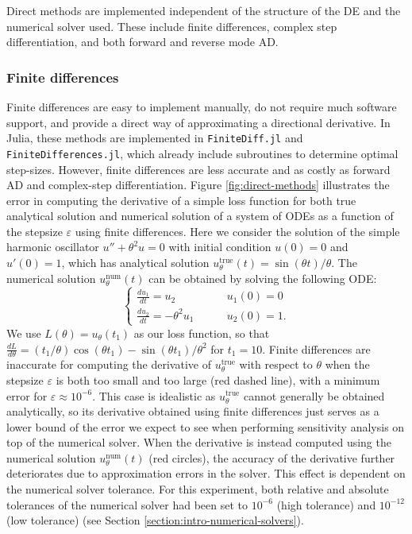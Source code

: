 Direct methods are implemented independent of the structure of the DE and the numerical solver used. 
These include finite differences, complex step differentiation, and both forward and reverse mode AD. 

\subsubsection{Finite differences}
\label{section:software-finite-differences}

Finite differences are easy to implement manually, do not require much software support, and provide a direct way of approximating a directional derivative. 
In Julia, these methods are implemented in \texttt{FiniteDiff.jl} and \texttt{FiniteDifferences.jl}, which already include subroutines to determine optimal step-sizes.
However, finite differences are less accurate and as costly as forward AD \cite{Griewank_1989} and complex-step differentiation. 
Figure \ref{fig:direct-methods} illustrates the error in computing the derivative of a simple loss function for both true analytical solution and numerical solution of a system of ODEs as a function of the stepsize $\varepsilon$ using finite differences.
Here we consider the solution of the simple harmonic oscillator $u'' + \theta^2 u = 0$ with initial condition $u(0)=0$ and $u'(0)=1$, which has analytical solution $u^\text{true}_\theta(t) = \sin(\theta t) / \theta$.
The numerical solution $u_\theta^\text{num}(t)$ can be obtained by solving the following ODE:
\begin{equation}
\begin{cases}
    \frac{du_1}{dt} = u_2 \,   & \qquad u_1(0) = 0 \\
    \frac{du_2}{dt} = - \theta^2 u_1 \,   & \qquad u_2(0) = 1.
    \label{eq:example-ode-direct-methods}
\end{cases}
\end{equation}
We use $L(\theta) = u_\theta(t_1)$ as our loss function, so that $\frac{dL}{d\theta} = (t_1 / \theta) \cos(\theta t_1)  - \sin (\theta t_1) / \theta^2$ for $t_1=10$.
Finite differences are inaccurate for computing the derivative of $u_\theta^\text{true}$ with respect to $\theta$ when the stepsize $\varepsilon$ is both too small and too large (red dashed line), with a minimum error for $\varepsilon \approx 10^{-6}$.
This case is idealistic as $u_\theta^\text{true}$ cannot generally be obtained analytically, so its derivative obtained using finite differences just serves as a lower bound of the error we expect to see when performing sensitivity analysis on top of the numerical solver. 
When the derivative is instead computed using the numerical solution $u_\theta^\text{num}(t)$ (red circles), the accuracy of the derivative further deteriorates due to approximation errors in the solver. 
This effect is dependent on the numerical solver tolerance. 
For this experiment, both relative and absolute tolerances of the numerical solver had been set to $10^{-6}$ (high tolerance) and $10^{-12}$ (low tolerance) (see Section \ref{section:intro-numerical-solvers}).

